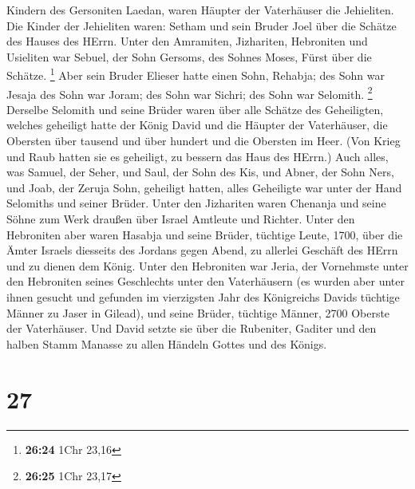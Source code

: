 Kindern des Gersoniten Laedan, waren Häupter der Vaterhäuser die
Jehieliten.  Die Kinder der Jehieliten waren: Setham und
sein Bruder Joel über die Schätze des Hauses des HErrn. 
Unter den Amramiten, Jizhariten, Hebroniten und Usieliten
 war Sebuel, der Sohn Gersoms, des Sohnes Moses, Fürst
über die Schätze. \footnote{\textbf{26:24} 1Chr 23,16} 
Aber sein Bruder Elieser hatte einen Sohn, Rehabja; des Sohn war Jesaja
des Sohn war Joram; des Sohn war Sichri; des Sohn war Selomith.
\footnote{\textbf{26:25} 1Chr 23,17}  Derselbe Selomith
und seine Brüder waren über alle Schätze des Geheiligten, welches
geheiligt hatte der König David und die Häupter der Vaterhäuser, die
Obersten über tausend und über hundert und die Obersten im Heer.
 (Von Krieg und Raub hatten sie es geheiligt, zu bessern
das Haus des HErrn.)  Auch alles, was Samuel, der Seher,
und Saul, der Sohn des Kis, und Abner, der Sohn Ners, und Joab, der
Zeruja Sohn, geheiligt hatten, alles Geheiligte war unter der Hand
Selomiths und seiner Brüder.  Unter den Jizhariten waren
Chenanja und seine Söhne zum Werk draußen über Israel Amtleute und
Richter.  Unter den Hebroniten aber waren Hasabja und
seine Brüder, tüchtige Leute, 1700, über die Ämter Israels diesseits des
Jordans gegen Abend, zu allerlei Geschäft des HErrn und zu dienen dem
König.  Unter den Hebroniten war Jeria, der Vornehmste
unter den Hebroniten seines Geschlechts unter den Vaterhäusern (es
wurden aber unter ihnen gesucht und gefunden im vierzigsten Jahr des
Königreichs Davids tüchtige Männer zu Jaser in Gilead), 
und seine Brüder, tüchtige Männer, 2700 Oberste der Vaterhäuser. Und
David setzte sie über die Rubeniter, Gaditer und den halben Stamm
Manasse zu allen Händeln Gottes und des Königs.

\hypertarget{section-26}{%
\section{27}\label{section-26}}

